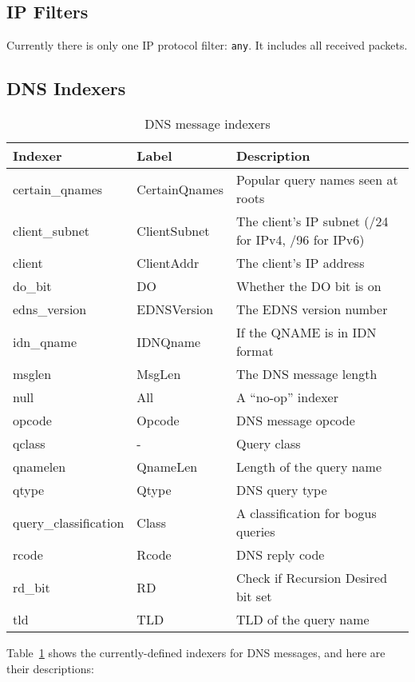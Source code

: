 \documentclass{report}
\begin{document}
\subsection{IP Filters}

Currently there is only one IP protocol filter: {\tt any\/}.
It includes all received packets.


\subsection{DNS Indexers}

\begin{table}
\begin{center}
\begin{tabular}{|lll|}
\hline
Indexer & Label & Description \\
\hline 
certain\_qnames & CertainQnames & Popular query names seen at roots \\
client\_subnet & ClientSubnet & The client's IP subnet (/24 for IPv4, /96 for IPv6) \\
client & ClientAddr & The client's IP address \\
do\_bit & DO & Whether the DO bit is on \\
edns\_version & EDNSVersion & The EDNS version number \\
idn\_qname & IDNQname & If the QNAME is in IDN format \\
msglen & MsgLen & The DNS message length \\
null & All & A ``no-op'' indexer \\
opcode & Opcode & DNS message opcode \\
qclass & - & Query class \\
qnamelen & QnameLen & Length of the query name \\
qtype & Qtype & DNS query type \\
query\_classification & Class & A classification for bogus queries \\
rcode & Rcode & DNS reply code \\
rd\_bit & RD & Check if Recursion Desired bit set \\
tld & TLD & TLD of the query name \\
\hline
\end{tabular}
\caption{\label{tbl-dns-indexers}DNS message indexers}
\end{center}
\end{table}

Table~\ref{tbl-dns-indexers} shows the currently-defined indexers
for DNS messages, and here are their descriptions:
\end{document}
